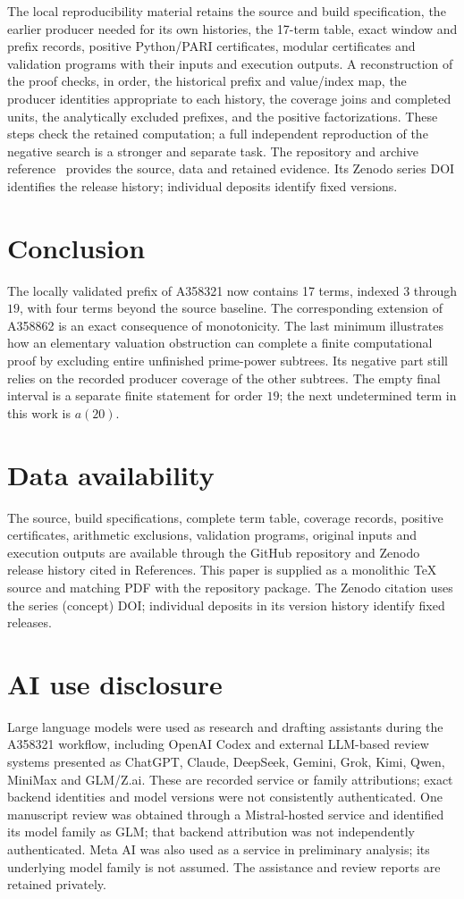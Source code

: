 \documentclass[11pt]{article}
\theoremstyle{remark}
\begin{document}
The local reproducibility material retains the source and build specification,
the earlier producer needed for its own histories, the 17-term table, exact
window and prefix records, positive Python/PARI certificates, modular
certificates and validation programs with their inputs and execution outputs.
A reconstruction of the proof checks, in order, the historical prefix and
value/index map, the producer identities appropriate to each history, the
coverage joins and completed units, the analytically excluded prefixes, and
the positive factorizations. These steps check the retained computation;
a full independent reproduction of the negative search is a stronger and
separate task. The repository and archive reference~\cite{corti} provides the source, data
and retained evidence. Its Zenodo series DOI identifies the release history;
individual deposits identify fixed versions.

\section{Conclusion}
The locally validated prefix of A358321 now contains 17 terms, indexed
$3$ through $19$, with four terms beyond the source baseline.
The corresponding extension of A358862 is an exact consequence of monotonicity.
The last minimum illustrates how an elementary valuation obstruction can
complete a finite computational proof by excluding entire unfinished
prime-power subtrees. Its negative part still relies on the recorded
producer coverage of the other subtrees. The empty final interval is a
separate finite statement for order $19$; the next undetermined term
in this work is $a(20)$.

\section*{Data availability}
The source, build specifications, complete term table, coverage records,
positive certificates, arithmetic exclusions, validation programs, original
inputs and execution outputs are available through the GitHub repository and
Zenodo release history cited in References. This paper is supplied as a
monolithic TeX source and matching PDF with the repository package. The
Zenodo citation uses the series (concept) DOI; individual deposits in its
version history identify fixed releases.

\section*{AI use disclosure}
Large language models were used as research and drafting assistants during
the A358321 workflow, including OpenAI Codex and external LLM-based review
systems presented as ChatGPT, Claude, DeepSeek, Gemini, Grok, Kimi, Qwen,
MiniMax and GLM/Z.ai. These are recorded service or family attributions;
exact backend identities and model versions were not consistently
authenticated. One manuscript review was obtained through a Mistral-hosted
service and identified its model family as GLM; that backend attribution
was not independently authenticated. Meta AI was also used as a service in preliminary analysis;
its underlying model family is not assumed. The assistance and review
reports are retained privately.
\end{document}
